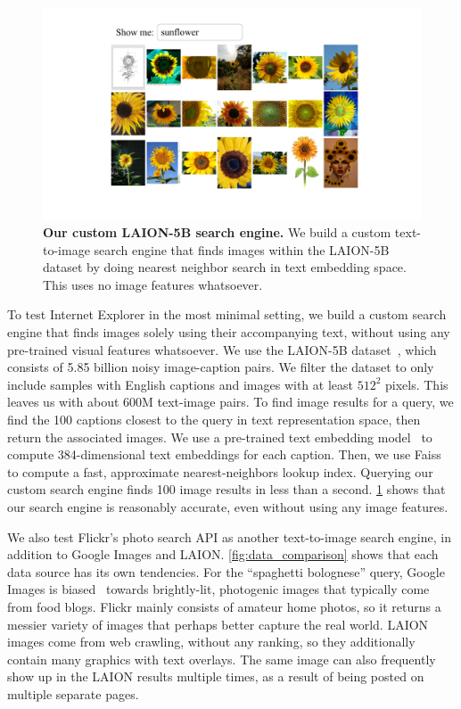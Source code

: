 \begin{figure}
\centering
    \vspace{-1.5em}
    \includegraphics[width=\linewidth]{figures/laion_search_engine.pdf}
    \vspace{-1em}
    \caption{\textbf{Our custom LAION-5B search engine.} We build a custom text-to-image search engine that finds images within the LAION-5B dataset by doing nearest neighbor search in text embedding space. This uses no image features whatsoever.}
    \label{fig:laion_search_engine}
    \vspace{-3em}
\end{figure}

To test Internet Explorer in the most minimal setting, we build a custom search engine that finds images solely using their accompanying text, without using any pre-trained visual features whatsoever. We use the LAION-5B dataset~\cite{schuhmann2022laion}, which consists of 5.85 billion noisy image-caption pairs. We filter the dataset to only include samples with English captions and images with at least $512^2$ pixels. This leaves us with about 600M text-image pairs. To find image results for a query, we find the 100 captions closest to the query in text representation space, then return the associated images.
We use a pre-trained text embedding model~\cite{reimers2019sentence} to compute 384-dimensional text embeddings for each caption. Then, we use Faiss~\cite{johnson2019billion} to compute a fast, approximate nearest-neighbors lookup index. Querying our custom search engine finds 100 image results in less than a second. \cref{fig:laion_search_engine} shows that our search engine is reasonably accurate, even without using any image features. 

We also test Flickr's photo search API as another text-to-image search engine, in addition to Google Images and LAION. \cref{fig:data_comparison} shows that each data source has its own tendencies. For the ``spaghetti bolognese'' query, Google Images is biased~\cite{mezuman2012learning,chen2015webly} towards brightly-lit, photogenic images that typically come from food blogs. Flickr mainly consists of amateur home photos, so it returns a messier variety of images that perhaps better capture the real world. LAION images come from web crawling, without any ranking, so they additionally contain many graphics with text overlays. The same image can also frequently show up in the LAION results multiple times, as a result of being posted on multiple separate pages. 


